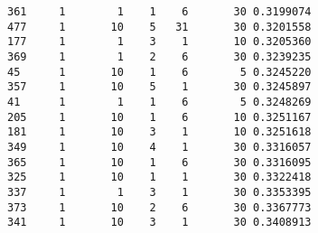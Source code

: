 \begin{verbatim}
361     1        1    1    6       30 0.3199074
477     1       10    5   31       30 0.3201558
177     1        1    3    1       10 0.3205360
369     1        1    2    6       30 0.3239235
45      1       10    1    6        5 0.3245220
357     1       10    5    1       30 0.3245897
41      1        1    1    6        5 0.3248269
205     1       10    1    6       10 0.3251167
181     1       10    3    1       10 0.3251618
349     1       10    4    1       30 0.3316057
365     1       10    1    6       30 0.3316095
325     1       10    1    1       30 0.3322418
337     1        1    3    1       30 0.3353395
373     1       10    2    6       30 0.3367773
341     1       10    3    1       30 0.3408913
\end{verbatim}
